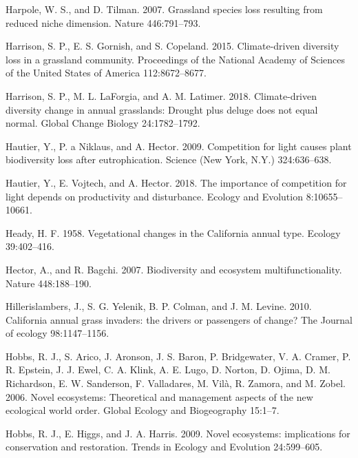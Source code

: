 \documentclass[twoside,12pt,final]{ucthesis-CA2012}
\begin{document}
\begin{ucmainmatter}
\leavevmode\hypertarget{ref-Harpole2007}{}%
Harpole, W. S., and D. Tilman. 2007. Grassland species loss resulting from reduced niche dimension. Nature 446:791--793.

\leavevmode\hypertarget{ref-Harrison2015}{}%
Harrison, S. P., E. S. Gornish, and S. Copeland. 2015. Climate-driven diversity loss in a grassland community. Proceedings of the National Academy of Sciences of the United States of America 112:8672--8677.

\leavevmode\hypertarget{ref-Harrison2018}{}%
Harrison, S. P., M. L. LaForgia, and A. M. Latimer. 2018. Climate-driven diversity change in annual grasslands: Drought plus deluge does not equal normal. Global Change Biology 24:1782--1792.

\leavevmode\hypertarget{ref-Hautier2009}{}%
Hautier, Y., P. a Niklaus, and A. Hector. 2009. Competition for light causes plant biodiversity loss after eutrophication. Science (New York, N.Y.) 324:636--638.

\leavevmode\hypertarget{ref-Hautier2018}{}%
Hautier, Y., E. Vojtech, and A. Hector. 2018. The importance of competition for light depends on productivity and disturbance. Ecology and Evolution 8:10655--10661.

\leavevmode\hypertarget{ref-Heady1958}{}%
Heady, H. F. 1958. Vegetational changes in the California annual type. Ecology 39:402--416.

\leavevmode\hypertarget{ref-Hector2007}{}%
Hector, A., and R. Bagchi. 2007. Biodiversity and ecosystem multifunctionality. Nature 448:188--190.

\leavevmode\hypertarget{ref-Hillerislambers2010}{}%
Hillerislambers, J., S. G. Yelenik, B. P. Colman, and J. M. Levine. 2010. California annual grass invaders: the drivers or passengers of change? The Journal of ecology 98:1147--1156.

\leavevmode\hypertarget{ref-Hobbs2006}{}%
Hobbs, R. J., S. Arico, J. Aronson, J. S. Baron, P. Bridgewater, V. A. Cramer, P. R. Epstein, J. J. Ewel, C. A. Klink, A. E. Lugo, D. Norton, D. Ojima, D. M. Richardson, E. W. Sanderson, F. Valladares, M. Vilà, R. Zamora, and M. Zobel. 2006. Novel ecosystems: Theoretical and management aspects of the new ecological world order. Global Ecology and Biogeography 15:1--7.

\leavevmode\hypertarget{ref-Hobbs2009}{}%
Hobbs, R. J., E. Higgs, and J. A. Harris. 2009. Novel ecosystems: implications for conservation and restoration. Trends in Ecology and Evolution 24:599--605.


\end{ucmainmatter}
\end{document}
